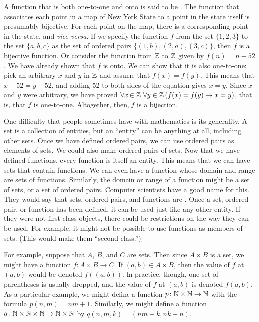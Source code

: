 A function that is both one-to-one and onto is said to be
.  The function that associates each point in
a map of New York State to a point in the state itself is
presumably bijective.  For each point on the map, there is
a corresponding point in the state, and \textit{vice versa}.
If we specify the function $f$ from the set $\{1,2,3\}$ to the 
set $\{a,b,c\}$ as the set of ordered pairs
$\{(1,b),(2,a),(3,c)\}$, then $f$ is a bijective function.
Or consider the function from ${\mathbb Z}$ to ${\mathbb Z}$ given by $f(n) =
n-52$.  We have already shown that $f$ is onto.  We can show
that it is also one-to-one: pick an arbitrary $x$ and $y$
in ${\mathbb Z}$ and assume that $f(x) = f(y)$.  This means that
$x-52 = y-52$, and adding 52 to both sides of the equation
gives $x=y$.  Since $x$ and $y$ were arbitrary, we have proved
$\forall x\in {\mathbb Z}\,\,\forall y\in {\mathbb Z}\,(f(x)=f(y)\rightarrow x=y)$,
that is, that $f$ is one-to-one.  Altogether, then, $f$ is a bijection.


\medbreak

One difficulty that people sometimes have with mathematics
is its generality.  A set is a collection of entities, but
an ``entity'' can be anything at all, including other sets.
Once we have defined ordered pairs, we can use ordered pairs as elements
of sets.  We could also make ordered pairs of sets.
Now that we have defined functions, every function is itself
an entity.  This means that we can have sets that contain
functions.  We can even have a function whose domain and
range are sets of functions.  Similarly, the domain or
range of a function might be a set of sets, or a set of
ordered pairs.  Computer scientists
have a good name for this.  They would say that sets, ordered pairs, and
functions are .  Once a set, ordered pair, or function
has been defined, it can be used just like any other entity.
If they were not first-class objects, there could be restrictions
on the way they can be used.  For example, it might not be
possible to use functions as members of sets. (This would make them
``second class.'')

For example, suppose that $A$, $B$, and $C$ are sets.  Then
since $A\times B$ is a set, we might have a function
$f\colon A\times B\to C$.  If $(a,b)\in A\times B$, then
the value of $f$ at $(a,b)$ would be denoted $f((a,b))$.
In practice, though, one set of parentheses is usually dropped,
and the value of $f$ at $(a,b)$ is denoted $f(a,b)$.
As a particular example, we might define a function
$p\colon {\mathbb N}\times{\mathbb N}\to{\mathbb N}$ with the formula $p(n,m)=nm+1$.
Similarly, we might define a function
$q\colon {\mathbb N}\times{\mathbb N}\times{\mathbb N}\to{\mathbb N}\times{\mathbb N}$ by
$q(n,m,k)=(nm-k,nk-n)$.

